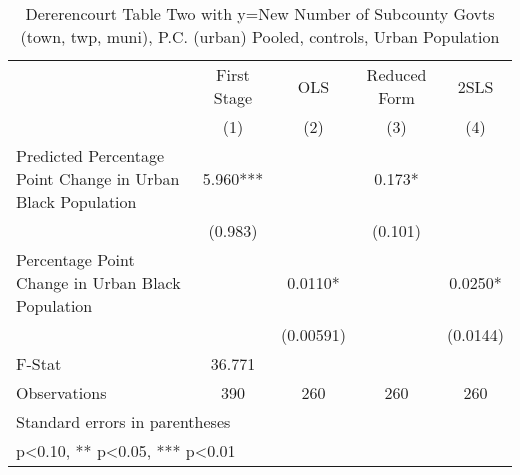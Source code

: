 \begin{table}[htbp]\centering
\def\sym#1{\ifmmode^{#1}\else\(^{#1}\)\fi}
\caption{Dererencourt Table Two with y=New Number of Subcounty Govts (town, twp, muni), P.C. (urban)  Pooled,  controls, Urban Population}
\begin{tabular}{l*{4}{c}}
\toprule
                    & First Stage   &         OLS   &Reduced Form   &        2SLS   \\
                    &\multicolumn{1}{c}{(1)}   &\multicolumn{1}{c}{(2)}   &\multicolumn{1}{c}{(3)}   &\multicolumn{1}{c}{(4)}   \\
\midrule
Predicted Percentage Point Change in Urban Black Population&       5.960***&               &       0.173*  &               \\
                    &     (0.983)   &               &     (0.101)   &               \\
\addlinespace
Percentage Point Change in Urban Black Population&               &      0.0110*  &               &      0.0250*  \\
                    &               &   (0.00591)   &               &    (0.0144)   \\
\midrule
F-Stat              &      36.771   &               &               &               \\
Observations        &         390   &         260   &         260   &         260   \\
\bottomrule
\multicolumn{5}{l}{\footnotesize Standard errors in parentheses}\\
\multicolumn{5}{l}{\footnotesize * p<0.10, ** p<0.05, *** p<0.01}\\
\end{tabular}
\end{table}
